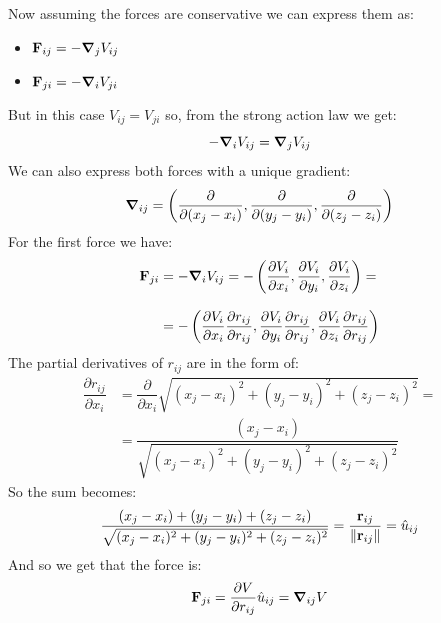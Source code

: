 Now assuming the forces are conservative we can express them as:
\begin{itemize}
    \item $\vb{F}_{ij}= -\grad_{j}V_{ij}$
    \item $\vb{F}_{ji}= -\grad_{i}V_{ji}$
\end{itemize}
But in this case $V_{ij}=V_{ji}$ so, from the strong action law we get:
\begin{equation}
    -\grad_iV_{ij}=\grad_jV_{ij}
\end{equation}
We can also express both forces with a unique gradient:
\begin{equation}
    \grad_{ij} = \left(\dfrac{\partial}{\partial(x_j-x_i)},\dfrac{\partial}{\partial(y_j-y_i)},\dfrac{\partial}{\partial(z_j-z_i)}\right)
\end{equation}
For the first force we have:
\begin{equation}
    \begin{split}
      \vb{F}_{ji} &= -\grad_iV_{ij}=-\left(\dfrac{\partial V_i}{\partial x_i },\dfrac{\partial V_i}{\partial y_i },\dfrac{\partial V_i}{\partial z_i }\right) = \\[8pt]
      &=-\left(\dfrac{\partial V_i}{\partial x_i}\dfrac{\partial r_{ij}}{\partial r_{ij}},\dfrac{\partial V_i}{\partial y_i }\dfrac{\partial r_{ij}}{\partial r_{ij}},\dfrac{\partial V_i}{\partial z_i }\dfrac{\partial r_{ij}}{\partial r_{ij}}\right)
    \end{split}
\end{equation}
The partial derivatives of $r_{ij}$ are in the form of:
\begin{equation}
    \begin{split}
      \dfrac{\partial r_{ij}}{\partial x_i} &= \dfrac{\partial }{\partial x_i}\sqrt{(x_j-x_i)^2 + (y_j-y_i)^2+ (z_j-z_i)^2} = \\[8pt]
      &= \dfrac{(x_j-x_i)}{\sqrt{(x_j-x_i)^2 + (y_j-y_i)^2+ (z_j-z_i)^2}}
    \end{split}
\end{equation}
So the sum becomes:
\begin{equation}
    \dfrac{(x_j-x_i)+(y_j-y_i)+(z_j-z_i)}{\sqrt{(x_j-x_i)^2 + (y_j-y_i)^2+ (z_j-z_i)^2}} = \dfrac{\vb{r}_{ij}}{\norm{\vb{r}_{ij}}} = \hat{u}_{ij}
\end{equation}
And so we get that the force is:
\begin{equation}
    \vb{F}_{ji}= \dfrac{\partial V}{\partial r_{ij}}\hat{u}_{ij} = \grad_{ij}V
\end{equation}
